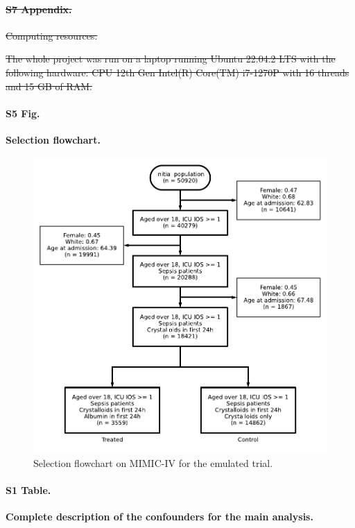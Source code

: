 \documentclass[10pt,letterpaper]{article}
\providecommand{\DIFdeltex}[1]{{\protect\color{red}\sout{#1}}}                      %
\providecommand{\DIFdelbegin}{} %
\providecommand{\DIFdelend}{} %
\providecommand{\DIFdel}[1]{\texorpdfstring{\DIFdeltex{#1}}{}} %
\newcommand{\DIFscaledelfig}{0.5}
\newlength{\DIFdelgraphicswidth} %
\newlength{\DIFdelgraphicsheight} %
\newcommand{\DIFdelincludegraphics}[2][]{%
\sbox{\DIFdelgraphicsbox}{\DIFOincludegraphics[#1]{#2}}%
\settoboxwidth{\DIFdelgraphicswidth}{\DIFdelgraphicsbox} %
\settoboxtotalheight{\DIFdelgraphicsheight}{\DIFdelgraphicsbox} %
\scalebox{\DIFscaledelfig}{%
\parbox[b]{\DIFdelgraphicswidth}{\usebox{\DIFdelgraphicsbox}\\[-\baselineskip] \rule{\DIFdelgraphicswidth}{0em}}\llap{\resizebox{\DIFdelgraphicswidth}{\DIFdelgraphicsheight}{%
\setlength{\unitlength}{\DIFdelgraphicswidth}%
\begin{picture}(1,1)%
\thicklines\linethickness{2pt} %
{\color[rgb]{1,0,0}\put(0,0){\framebox(1,1){}}}%
{\color[rgb]{1,0,0}\put(0,0){\line( 1,1){1}}}%
{\color[rgb]{1,0,0}\put(0,1){\line(1,-1){1}}}%
\end{picture}%
}\hspace*{3pt}}} %
} %
\DeclareRobustCommand{\DIFdelbegin}{\DIFOdelbegin \let\includegraphics\DIFdelincludegraphics} %
\DeclareRobustCommand{\DIFdelend}{\DIFOaddend \let\includegraphics\DIFOincludegraphics} %
\begin{document}
\DIFdelbegin \paragraph*{\DIFdel{S7 Appendix.}}
\DIFdel{Computing resources.}%

\DIFdel{The whole project was run on a laptop running Ubuntu 22.04.2 LTS with the following hardware:
CPU 12th Gen Intel(R) Core(TM) i7-1270P with 16 threads and 15 GB of RAM.
}%

\DIFdelend \paragraph*{S5 Fig.}
\label{apd:selection_flowchart}
{\bf Selection flowchart.}

\begin{figure}[!htb]
  \centering
  \includegraphics[width=0.7\linewidth]{img_supp/albumin_for_sepsis__obs_1d__flowchart_albumin_for_sepsis.pdf}
  \caption{Selection flowchart on MIMIC-IV for the emulated trial.}\label{fig:selection_flowchart}
\end{figure}
\clearpage


\paragraph*{S1 Table.}
\label{apd:albumin_for_sepsis:table1_complete}
{\bf Complete description of the confounders for the main analysis.}
\begin{table}[h!]
  \resizebox{\textwidth}{!}{%
    
  }\\
  \caption{Characteristics of the trial population measured on the first 24
    hours of ICU stay. \\
    Risk scores (AKI, SOFA, SAPSII) and lactates have been summarized as the
    maximum value during the 24 hour period for each stay. Total cumulative urine output has
    been computed. Other variables have been aggregated by taking mean during
    the 24 hour period.}\label{apd:table:albumin_for_sepsis:table1_complete}
\end{table}
\clearpage
\end{document}
